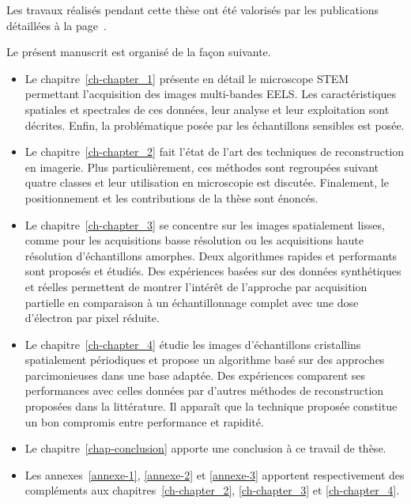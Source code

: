 Les travaux réalisés pendant cette thèse ont été valorisés par les publications détaillées à la page~\pageref{ch-liste-publis}.


 
 
Le présent manuscrit est organisé de la façon suivante.
\begin{itemize}
    \item Le chapitre~\ref{ch-chapter_1} présente en détail le microscope STEM permettant l'acquisition des images multi-bandes EELS. Les caractéristiques spatiales et spectrales de ces données, leur analyse et leur exploitation sont décrites. Enfin, la problématique posée par les échantillons sensibles  est posée.
    \item Le chapitre~\ref{ch-chapter_2} fait l'état de l'art des techniques de reconstruction en imagerie. Plus particulièrement, ces méthodes sont regroupées suivant quatre classes et leur utilisation en microscopie est discutée. Finalement, le positionnement et les contributions de la thèse sont énoncés.
    \item Le chapitre~\ref{ch-chapter_3} se concentre sur les images spatialement lisses, comme pour les acquisitions basse résolution ou les acquisitions haute résolution d'échantillons amorphes. Deux algorithmes rapides et performants sont proposés et étudiés. Des expériences basées sur des données synthétiques et réelles permettent de montrer l'intérêt de l'approche par acquisition partielle en comparaison à un échantillonnage complet avec une dose d'électron par pixel réduite.
    \item Le chapitre~\ref{ch-chapter_4} étudie les images d'échantillons cristallins spatialement périodiques et propose un algorithme basé sur des approches parcimonieuses dans une base adaptée. Des expériences comparent ses performances avec celles données par d'autres méthodes de reconstruction proposées dans la littérature. Il apparaît que la technique proposée constitue un bon compromis entre performance et rapidité.
    \item Le chapitre~\ref{chap-conclusion} apporte une conclusion à ce travail de thèse.
    \item Les annexes~\ref{annexe-1}, \ref{annexe-2} et \ref{annexe-3} apportent respectivement des compléments aux chapitres~\ref{ch-chapter_2}, \ref{ch-chapter_3} et \ref{ch-chapter_4}.
\end{itemize} 
 
 
 
 





